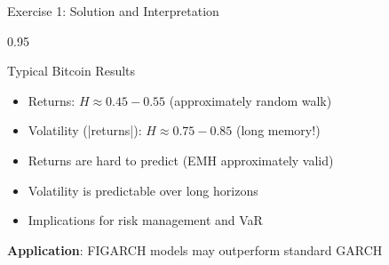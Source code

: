 \documentclass[9pt, aspectratio=169, t]{beamer}
\begin{document}
\begin{frame}{Exercise 1: Solution and Interpretation}
    \begin{cminipage}{0.95\textwidth}
    \begin{exampleblock}{Typical Bitcoin Results}
        \begin{itemize}\setlength{\itemsep}{0pt}
            \item Returns: $H \approx 0.45-0.55$ (approximately random walk)
            \item Volatility (|returns|): $H \approx 0.75-0.85$ (long memory!)
        \end{itemize}
    \end{exampleblock}

    \vspace{0.3cm}
    \begin{itemize}\setlength{\itemsep}{0pt}
        \item Returns are hard to predict (EMH approximately valid)
        \item Volatility is predictable over long horizons
        \item Implications for risk management and VaR
    \end{itemize}

    \vspace{0.2cm}
    \textbf{Application}: FIGARCH models may outperform standard GARCH
    \end{cminipage}
\end{frame}
\end{document}
